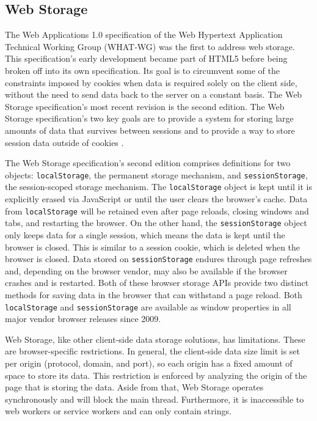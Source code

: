 \subsection*{Web Storage}
The Web Applications 1.0 specification of the Web Hypertext Application Technical Working Group (WHAT-WG) was the first to address web storage. This specification's early development became part of HTML5 before being broken off into its own specification. Its goal is to circumvent some of the constraints imposed by cookies when data is required solely on the client side, without the need to send data back to the server on a constant basis. The Web Storage specification's most recent revision is the second edition. The Web Storage specification's two key goals are to provide a system for storing large amounts of data that survives between sessions and to provide a way to store session data outside of cookies \autocite{frisbie2019professional}.

The Web Storage specification's second edition comprises definitions for two objects: \texttt{localStorage}, the permanent storage mechanism, and \texttt{sessionStorage}, the session-scoped storage mechanism. The \texttt{localStorage} object is kept until it is explicitly erased via JavaScript or until the user clears the browser's cache. Data from \texttt{localStorage} will be retained even after page reloads, closing windows and tabs, and restarting the browser. On the other hand, the \texttt{sessionStorage} object only keeps data for a single session, which means the data is kept until the browser is closed. This is similar to a session cookie, which is deleted when the browser is closed. Data stored on \texttt{sessionStorage} endures through page refreshes and, depending on the browser vendor, may also be available if the browser crashes and is restarted. Both of these browser storage APIs provide two distinct methods for saving data in the browser that can withstand a page reload. Both \texttt{localStorage} and \texttt{sessionStorage} are available as window properties in all major vendor browser releases since 2009.

Web Storage, like other client-side data storage solutions, has limitations. These are browser-specific restrictions. In general, the client-side data size limit is set per origin (protocol, domain, and port), so each origin has a fixed amount of space to store its data. This restriction is enforced by analyzing the origin of the page that is storing the data. Aside from that, Web Storage operates synchronously and will block the main thread. Furthermore, it is inaccessible to web workers or service workers and can only contain strings.

